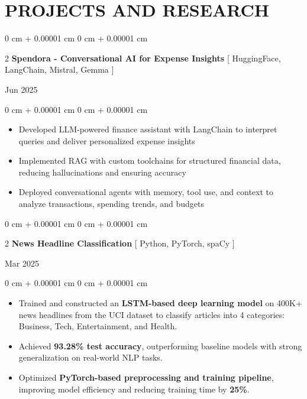 \documentclass[9pt, letterpaper]{article}
\newenvironment{highlights}{
    \begin{itemize}[
        topsep=0.05 cm,
        parsep=0 pt,
        partopsep=0pt,
        itemsep=0pt,
        leftmargin=10pt
    ]
}{
    \end{itemize}
} %
\newenvironment{onecolentry}{
    \begin{adjustwidth}{
        0 cm + 0.00001 cm}{
        0 cm + 0.00001 cm}
}{
    \end{adjustwidth}
} %
\newenvironment{twocolentry}[2][]{
    \onecolentry
    \def\secondColumn{#2}
    \setcolumnwidth{\fill, 4.5 cm}
    \begin{paracol}{2}
}{
    \switchcolumn \raggedleft \secondColumn
    \end{paracol}
    \endonecolentry
} %
\begin{document}
% 


% 

\section{PROJECTS AND RESEARCH}

    \begin{twocolentry}
        {Jun 2025}\textbf{Spendora - Conversational AI for Expense Insights} [ HuggingFace, LangChain, Mistral, Gemma ]
    \end{twocolentry}
    \begin{onecolentry}
        \begin{highlights}
            \item{Developed LLM-powered finance assistant with LangChain to interpret queries and deliver personalized expense insights}
            \item{Implemented RAG with custom toolchains for structured financial data, reducing hallucinations and ensuring accuracy}
            \item{Deployed conversational agents with memory, tool use, and context to analyze transactions, spending trends, and budgets}
        \end{highlights}
    \end{onecolentry}

    \begin{twocolentry}
        {Mar 2025}\textbf{News Headline Classification} [ Python, PyTorch, spaCy ]
    \end{twocolentry}
    \begin{onecolentry}
        \begin{highlights}
            \item Trained and constructed an \textbf{LSTM-based deep learning model} on 400K+ news headlines from the UCI dataset to classify articles into 4 categories: Business, Tech, Entertainment, and Health.
            \item Achieved \textbf{93.28\% test accuracy}, outperforming baseline models with strong generalization on real-world NLP tasks.
            \item Optimized \textbf{PyTorch-based preprocessing and training pipeline}, improving model efficiency and reducing training time by \textbf{25\%}.
        \end{highlights}
    \end{onecolentry}
\end{document}
